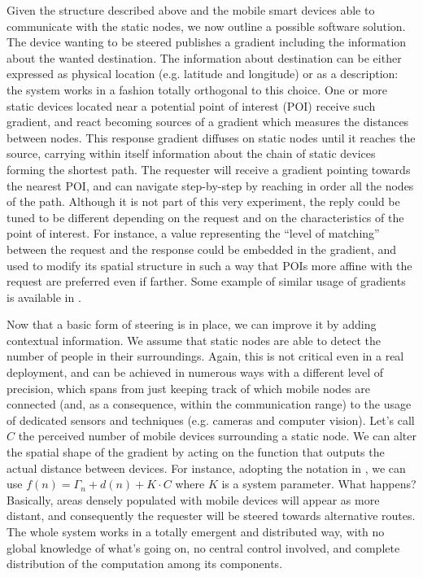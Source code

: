 \documentclass[12pt,a4paper,twoside,openright]{book}
\begin{document}
Given the structure described above and the mobile smart devices able to communicate with the static nodes, we now outline a possible software solution.
%
The device wanting to be steered publishes a gradient including the information about the wanted destination.
%
The information about destination can be either expressed as physical location (e.g. latitude and longitude) or as a description: the system works in a fashion totally orthogonal to this choice.
%
One or more static devices located near a potential point of interest (POI) receive such gradient, and react becoming sources of a gradient which measures the distances between nodes.
%
This response gradient diffuses on static nodes until it reaches the source, carrying within itself information about the chain of static devices forming the shortest path.
%
The requester will receive a gradient pointing towards the nearest POI, and can navigate step-by-step by reaching in order all the nodes of the path.
%
Although it is not part of this very experiment, the reply could be tuned to be different depending on the request and on the characteristics of the point of interest.
%
For instance, a value representing the ``level of matching'' between the request and the response could be embedded in the gradient, and used to modify its spatial structure in such a way that POIs more affine with the request are preferred even if farther.
%
Some example of similar usage of gradients is available in \cite{SemMatchingSAC2013}.

Now that a basic form of steering is in place, we can improve it by adding contextual information.
%
We assume that static nodes are able to detect the number of people in their surroundings.
%
Again, this is not critical even in a real deployment, and can be achieved in numerous ways with a different level of precision, which spans from just keeping track of which mobile nodes are connected (and, as a consequence, within the communication range) to the usage of dedicated sensors and techniques (e.g. cameras and computer vision).
%
Let's call $C$ the perceived number of mobile devices surrounding a static node.
%
We can alter the spatial shape of the gradient by acting on the function that outputs the actual distance between devices.
%
For instance, adopting the notation in , we can use $f(n) = \varGamma_{n} +d(n) + K \cdot{} C$ where $K$ is a system parameter.
%
What happens? Basically, areas densely populated with mobile devices will appear as more distant, and consequently the requester will be steered towards alternative routes.
%
The whole system works in a totally emergent and distributed way, with no global knowledge of what's going on, no central control involved, and complete distribution of the computation among its components.
\end{document}

